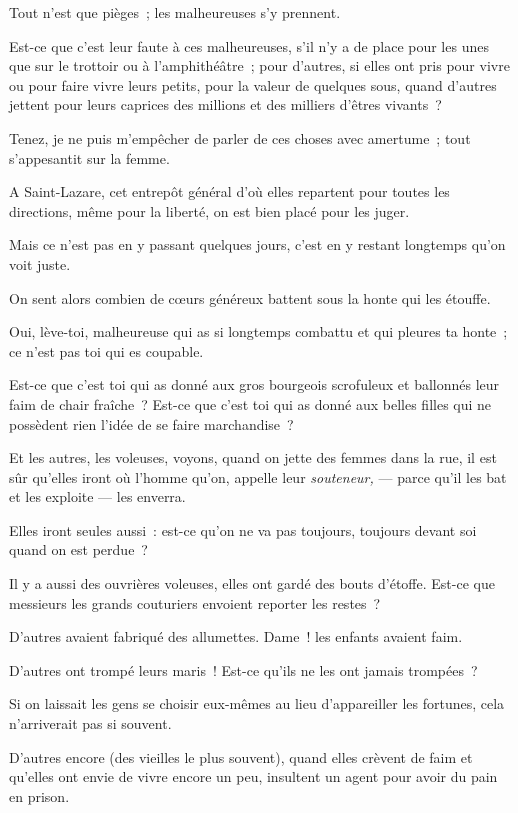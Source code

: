 \documentclass[french,twoside]{book} %
\begin{document}
\noindent Tout n’est que pièges ; les malheureuses s’y prennent.\par
 Est-ce que c’est leur faute à ces malheureuses, s’il n’y a de place pour les unes que sur le trottoir ou à l’amphithéâtre ; pour d’autres, si elles ont pris pour vivre ou pour faire vivre leurs petits, pour la valeur de quelques sous, quand d’autres jettent pour leurs caprices des millions et des milliers d’êtres vivants ?\par
Tenez, je ne puis m’empêcher de parler de ces choses avec amertume ; tout s’appesantit sur la femme.\par
A Saint-Lazare, cet entrepôt général d’où elles repartent pour toutes les directions, même pour la liberté, on est bien placé pour les juger.\par
Mais ce n’est pas en y passant quelques jours, c’est en y restant longtemps qu’on voit juste.\par
On sent alors combien de cœurs généreux battent sous la honte qui les étouffe.\par
Oui, lève-toi, malheureuse qui as si longtemps combattu et qui pleures ta honte ; ce n’est pas toi qui es coupable.\par
Est-ce que c’est toi qui as donné aux gros bourgeois scrofuleux et ballonnés leur faim de chair fraîche ? Est-ce que c’est toi qui as donné aux belles filles qui ne possèdent rien l’idée de se faire marchandise ?\par
Et les autres, les voleuses, voyons, quand on jette des femmes dans la rue, il est sûr qu’elles  iront où l’homme qu’on, appelle leur \emph{souteneur,} — parce qu’il les bat et les exploite — les enverra. \par
Elles iront seules aussi : est-ce qu’on ne va pas toujours, toujours devant soi quand on est perdue ?\par
Il y a aussi des ouvrières voleuses, elles ont gardé des bouts d’étoffe. Est-ce que messieurs les grands couturiers envoient reporter les restes ?\par
D’autres avaient fabriqué des allumettes. Dame ! les enfants avaient faim.\par
D’autres ont trompé leurs maris ! Est-ce qu’ils ne les ont jamais trompées ?\par
Si on laissait les gens se choisir eux-mêmes au lieu d’appareiller les fortunes, cela n’arriverait pas si souvent.\par
D’autres encore (des vieilles le plus souvent), quand elles crèvent de faim et qu’elles ont envie de vivre encore un peu, insultent un agent pour avoir du pain en prison.\par
\end{document}
